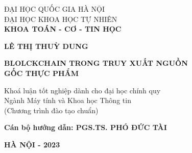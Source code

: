 \begin{titlepage}
    \begin{center}        
        {\fontsize{14}{10}\selectfont 
        ĐẠI HỌC QUỐC GIA HÀ NỘI\\
        ĐẠI HỌC KHOA HỌC TỰ NHIÊN\\
        \fontsize{13}{16}\selectfont \textbf{KHOA TOÁN - CƠ - TIN HỌC}
        }
        \end{center}
        
        \vspace*{3cm}
        
        \begin{center}
            {
                \fontsize{14}{0}\selectfont \textbf{LÊ THỊ THUỲ DUNG}
            }
        \end{center}
        \begin{center}
       
        \vspace*{3cm}
        {\fontsize{18}{24}\selectfont \textbf{ BLOLCKCHAIN TRONG TRUY XUẤT NGUỒN \\ GỐC THỰC PHẨM}}
        \end{center}
        \vspace*{2cm}
        \begin{center}
        {
        \fontsize{14}{16}\selectfont Khoá luận tốt nghiệp dành cho đại học chính quy \\
        \fontsize{14}{16}\selectfont Ngành Máy tính và Khoa học Thông tin \\
        (Chương trình đào tạo chuẩn)
        }
        \end{center}
  
        \vspace*{1cm}
        \begin{center}
            {
                \fontsize{14}{0}\selectfont \textbf{ Cán bộ hướng dẫn: PGS.TS. PHÓ ĐỨC TÀI}
            }
        \end{center}
        \vfill
         \centerline{
            \fontsize{14}{0}\selectfont \textbf{ HÀ NỘI - 2023}}
        
    \end{titlepage}
    
    